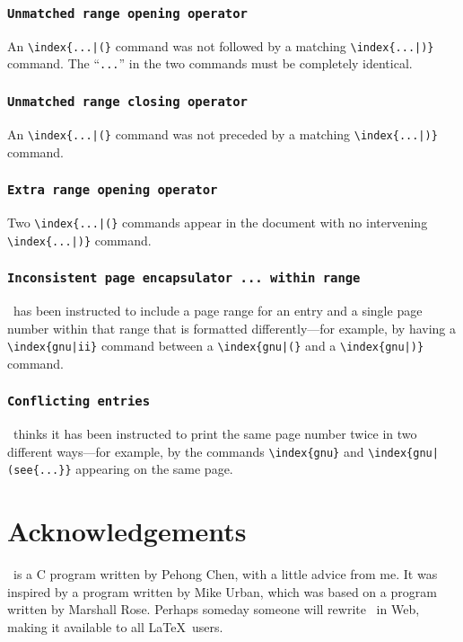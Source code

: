 \subsubsection*{\tt Unmatched range opening operator}

An \verb/\index{...|(}/ command was not followed by a matching
  \linebreak%
\verb/\index{...|)}/ command.  The ``\verb|...|'' in the two
commands must be completely identical.


\subsubsection*{\tt Unmatched range closing operator }

An \verb/\index{...|(}/ command was not preceded by a matching
  \linebreak%
\verb/\index{...|)}/ command. 

\subsubsection*{\tt Extra range opening operator }

Two \verb/\index{...|(}/ commands appear in the document with no intervening
\verb/\index{...|)}/ command.



\subsubsection*{\tt Inconsistent page encapsulator ... within range}

\MakeIndex\ has been instructed to include a page range for an entry
and a single page number within that range that is formatted
differently---for example, by having a 
\verb+\index{gnu|ii}+ command between a \verb+\index{gnu|(}+
and a \verb+\index{gnu|)}+ command.


\subsubsection*{\tt Conflicting entries}

\MakeIndex\ thinks it has been instructed to print the same page number
twice in two different ways---for example, by the commands
\verb|\index{gnu}| and \verb/\index{gnu|(see{...}}/ appearing on the
same page.



\section*{Acknowledgements}

\MakeIndex\ is a C program written by Pehong Chen, with a little
advice from me.  It was inspired by a program written by Mike Urban,
which was based on a program written by Marshall Rose.  Perhaps someday
someone will rewrite \MakeIndex\ in Web, making it available to all
\LaTeX\ users.



